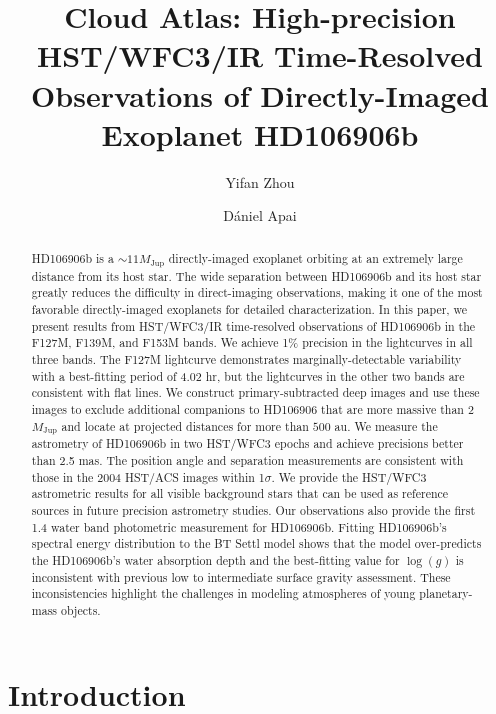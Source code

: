 \documentclass[twocolumn]{aastex62}
\newcommand{\mjup}{\ensuremath{M_\mathrm{Jup}}\xspace}
\newcommand{\logg}{\ensuremath{\log(g)}\xspace}
\begin{document}
\title{Cloud Atlas: High-precision HST/WFC3/IR Time-Resolved Observations of Directly-Imaged Exoplanet HD106906b}


\author{Yifan Zhou}

\author{D\'aniel Apai}

\begin{abstract}
 HD106906b is a $\sim11\mjup$ directly-imaged exoplanet orbiting at an extremely large distance from its host star. The wide separation between HD106906b and its host star greatly reduces the difficulty in direct-imaging observations, making it one of the most favorable directly-imaged exoplanets for detailed characterization. In this paper, we present results from HST/WFC3/IR time-resolved observations of HD106906b in the F127M, F139M, and F153M bands. We achieve 1\% precision in the lightcurves in all three bands. The F127M lightcurve demonstrates marginally-detectable variability with a best-fitting period of 4.02 hr, but the lightcurves in the other two bands are consistent with flat lines. We construct primary-subtracted deep images and use these images to exclude additional companions to HD106906 that are more massive than 2\mjup{} and locate at projected distances for more than $500$ au. We measure the astrometry of HD106906b in two HST/WFC3 epochs and achieve precisions better than 2.5 mas. The position angle and separation measurements are consistent with those in the 2004 HST/ACS images within 1$\sigma$. We provide the HST/WFC3 astrometric results for all visible background stars that can be used as reference sources in future precision astrometry studies. Our observations also provide the first 1.4 \micron{} water band photometric measurement for HD106906b. Fitting HD106906b's spectral energy distribution to the BT Settl model shows that the model over-predicts the HD106906b's water absorption depth and the best-fitting value for \logg{} is inconsistent with previous low to intermediate surface gravity assessment. These inconsistencies highlight the challenges in modeling atmospheres of young planetary-mass objects.
\end{abstract}


\section{Introduction}
\end{document}

